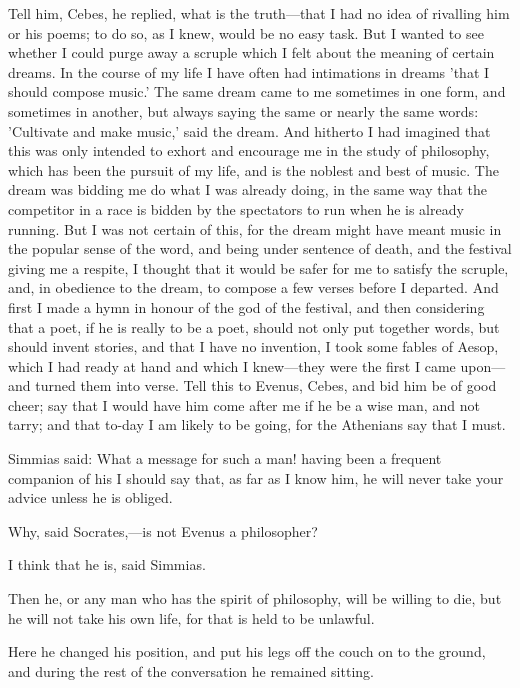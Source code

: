 \documentclass[11pt,letter]{article}
\begin{document}
\par  Tell him, Cebes, he replied, what is the truth—that I had no idea of rivalling him or his poems; to do so, as I knew, would be no easy task. But I wanted to see whether I could purge away a scruple which I felt about the meaning of certain dreams. In the course of my life I have often had intimations in dreams 'that I should compose music.' The same dream came to me sometimes in one form, and sometimes in another, but always saying the same or nearly the same words: 'Cultivate and make music,' said the dream. And hitherto I had imagined that this was only intended to exhort and encourage me in the study of philosophy, which has been the pursuit of my life, and is the noblest and best of music. The dream was bidding me do what I was already doing, in the same way that the competitor in a race is bidden by the spectators to run when he is already running. But I was not certain of this, for the dream might have meant music in the popular sense of the word, and being under sentence of death, and the festival giving me a respite, I thought that it would be safer for me to satisfy the scruple, and, in obedience to the dream, to compose a few verses before I departed. And first I made a hymn in honour of the god of the festival, and then considering that a poet, if he is really to be a poet, should not only put together words, but should invent stories, and that I have no invention, I took some fables of Aesop, which I had ready at hand and which I knew—they were the first I came upon—and turned them into verse. Tell this to Evenus, Cebes, and bid him be of good cheer; say that I would have him come after me if he be a wise man, and not tarry; and that to-day I am likely to be going, for the Athenians say that I must.

\par  Simmias said: What a message for such a man! having been a frequent companion of his I should say that, as far as I know him, he will never take your advice unless he is obliged.

\par  Why, said Socrates,—is not Evenus a philosopher?

\par  I think that he is, said Simmias.

\par  Then he, or any man who has the spirit of philosophy, will be willing to die, but he will not take his own life, for that is held to be unlawful.

\par  Here he changed his position, and put his legs off the couch on to the ground, and during the rest of the conversation he remained sitting.
\end{document}
